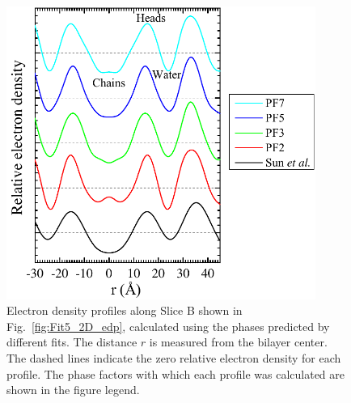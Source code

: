 \begin{figure}[htbp]
  \centering
  \includegraphics[width=0.9\textwidth]{figures/ripple/LAXS/minor_diff_models}
  \caption{Electron density profiles along Slice B shown in Fig.~\ref{fig:Fit5_2D_edp}, 
  calculated using the phases
  predicted by different fits. The distance $r$ is measured from the bilayer 
  center. 
  The dashed lines indicate the zero relative electron density for each profile.
  The phase factors with which each profile 
  was calculated are shown in the figure legend.}
  \label{fig:minor_diff_models}
\end{figure}





